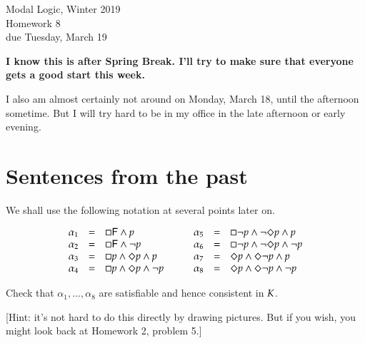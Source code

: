 \documentclass[12pt]{article}
\begin{document}
\begin{center}
{
\Large  Modal Logic, Winter 2019   \\
   Homework 8
\\
due Tuesday, March 19 \\
} 
\end{center}

{\bf I know this is after Spring Break.   I'll try to make sure that everyone gets a good start this week.}

I also am almost certainly not around on Monday, March 18, until the afternoon sometime.   But I  will try hard
to be in my office in the late afternoon or early evening.

\section{Sentences from the past}
We shall use the following notation at several points later on.

\begin{equation}
\begin{array}{lcl}
\alpha_1 & = & \Box{\sf F}\wedge p \\
\alpha_2 & = & \Box{\sf F}\wedge \neg p\\
\alpha_3 & = & \Box p\wedge\Diamond p \wedge p\\
\alpha_4 & = & \Box p\wedge\Diamond p\wedge \neg p \\
\end{array}
\qquad
\begin{array}{lcl}
\alpha_5 & = & \Box \neg p\wedge\neg \Diamond p\wedge p \\
\alpha_6 & = &  \Box \neg p\wedge\neg \Diamond p\wedge \neg p \\
\alpha_7 & = & \Diamond p\wedge\Diamond \neg p  \wedge p \\
\alpha_8 & = &  \Diamond p\wedge\Diamond \neg p\wedge \neg p \\
\end{array}
\label{eq-alphas}
\end{equation}




{\rm Check that $\alpha_1,\ldots, \alpha_8$ are 
satisfiable and hence consistent in ${K}$.
}

[Hint: it's not hard to do this directly by drawing pictures.
But if you wish, you might look back at Homework 2, problem 5.]
\end{document}
